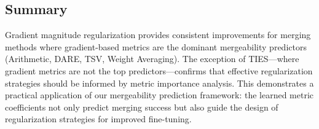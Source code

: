 \subsection{Summary}

Gradient magnitude regularization provides consistent improvements for merging methods where gradient-based metrics are the dominant mergeability predictors (Arithmetic, DARE, TSV, Weight Averaging). The exception of TIES---where gradient metrics are not the top predictors---confirms that effective regularization strategies should be informed by metric importance analysis. This demonstrates a practical application of our mergeability prediction framework: the learned metric coefficients not only predict merging success but also guide the design of regularization strategies for improved fine-tuning.

